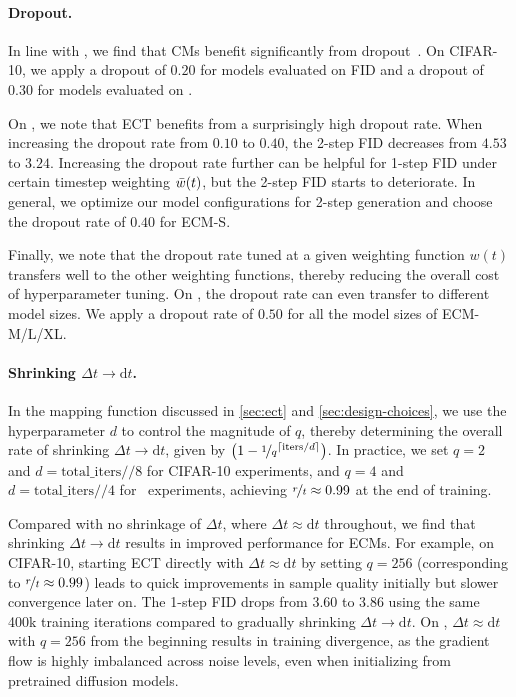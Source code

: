 \vspace{-10pt}
\paragraph{Dropout.} In line with \citep{ict}, we find that CMs benefit significantly from dropout~\citep{dropout}.  
On CIFAR-10, we apply a dropout of $0.20$ for models evaluated on FID and a dropout of $0.30$ for models evaluated on \dino. 

On \imgnet, we note that ECT benefits from a surprisingly high dropout rate. When increasing the dropout rate from $0.10$ to $0.40$, the 2-step FID decreases from $4.53$ to $3.24$. 
Increasing the dropout rate further can be helpful for 1-step FID under certain timestep weighting $\Bar{w}(t)$, but the 2-step FID starts to deteriorate.
In general, we optimize our model configurations for 2-step generation and choose the dropout rate of $0.40$ for ECM-S.

Finally, we note that the dropout rate tuned at a given weighting function $w(t)$ transfers well to the other weighting functions, thereby reducing the overall cost of hyperparameter tuning. 
On \imgnet, the dropout rate can even transfer to different model sizes. We apply a dropout rate of $0.50$ for all the model sizes of ECM-M/L/XL.


\paragraph{Shrinking $\Delta t \to \mathrm{d}t$.} 
In the mapping function discussed in \cref{sec:ect} and \cref{sec:design-choices}, we use the hyperparameter $d$ to control the magnitude of $q$, thereby determining the overall rate of shrinking $\Delta t \to \mathrm{d}t$, given by $\left(1 - \nicefrac{1}{q}^{\lceil\text{iters}/d\rceil} \right)$.
In practice, we set $q=2$ and $d = \text{total\_iters}//8$ for CIFAR-10 experiments, and $q=4$ and $d = \text{total\_iters}//4$ for \imgnet\ experiments, achieving $\nicefrac{r}{t} \approx 0.99$ at the end of training.

Compared with no shrinkage of $\Delta t$, where $\Delta t \approx \mathrm{d}t$ throughout, we find that shrinking $\Delta t \to \mathrm{d}t$ results in improved performance for ECMs. 
%
For example, on CIFAR-10, starting ECT directly with $\Delta t \approx \mathrm{d}t$ by setting $q=256$ (corresponding to $\nicefrac{r}{t} \approx 0.99$) leads to quick improvements in sample quality initially but slower convergence later on. The 1-step FID drops from 3.60 to 3.86 using the same 400k training iterations compared to gradually shrinking $\Delta t \to \mathrm{d}t$. 
%
On \imgnet, $\Delta t \approx \mathrm{d}t$ with $q=256$ from the beginning results in training divergence, as the gradient flow is highly imbalanced across noise levels, even when initializing from pretrained diffusion models.

